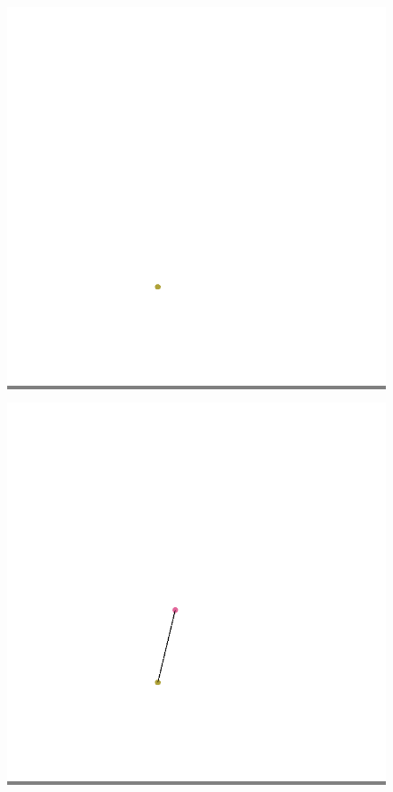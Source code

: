 \documentclass{article}
\begin{document}
        \begin{figure}
            \begin{minipage}{0.2\textwidth}
            \colorbox{gray}{\includegraphics[width=\linewidth]{./images/color-1.png}}
            \end{minipage}
            \hspace{\fill}
            \begin{minipage}{0.2\textwidth}
            \colorbox{gray}{\includegraphics[width=\linewidth]{./images/color-2.png}}

\end{minipage}
\end{figure}
\end{document}
